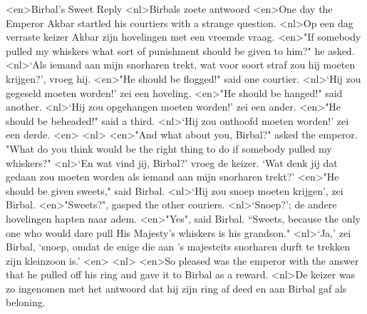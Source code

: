 <en>Birbal's Sweet Reply 
<nl>Birbals zoete antwoord
<en>One day the Emperor Akbar startled his courtiers with a strange question. 
<nl>Op een dag verraste keizer Akbar zijn hovelingen met een vreemde vraag.
<en>"If somebody pulled my whiskers what sort of punishment should be given to him?" he asked. 
<nl>`Als iemand aan mijn snorharen trekt, wat voor soort straf zou hij moeten krijgen?', vroeg hij.
<en>"He should be flogged!" said one courtier. 
<nl>`Hij zou gegeseld moeten worden!' zei een hoveling.
<en>"He should be hanged!" said another. 
<nl>`Hij zou opgehangen moeten worden!' zei een ander.
<en>"He should be beheaded!" said a third. 
<nl>`Hij zou onthoofd moeten worden!' zei een derde.
<en>
<nl>
<en>"And what about you, Birbal?" asked the emperor. "What do you think would be the right thing to do if somebody pulled my whiskers?" 
<nl>`En wat vind jij, Birbal?' vroeg de keizer. `Wat denk jij dat gedaan zou moeten worden als iemand aan mijn snorharen trekt?'
<en>"He should be given sweets," said Birbal. 
<nl>`Hij zou snoep moeten krijgen', zei Birbal.
<en>"Sweets?", gasped the other couriers. 
<nl>`Snoep?'; de andere hovelingen hapten naar adem.
<en>"Yes", said Birbal. “Sweets, because the only one who would dare pull His Majesty's whiskers is his grandson." 
<nl>`Ja,' zei Birbal, `snoep, omdat de enige die aan 's majesteits snorharen durft te trekken zijn kleinzoon is.'
<en>
<nl>
<en>So pleased was the emperor with the answer that he pulled off his ring and gave it to Birbal as a reward. 
<nl>De keizer was zo ingenomen met het antwoord dat hij zijn ring af deed en  aan Birbal gaf als beloning.
